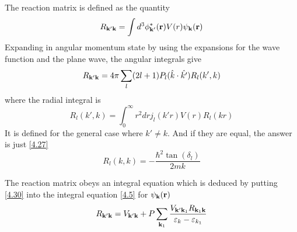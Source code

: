 The reaction matrix is defined as the quantity
\begin{equation}
    R_{\mathbf{k}' \mathbf{k}} = \int d^3 \phi^*_{\mathbf{k}'}(\mathbf{r}) V(r) \psi_{\mathbf{k}}(\mathbf{r})  \label{4.30}
\end{equation}
Expanding in angular momentum state by using the expansions for the wave function and the plane wave, the angular integrals give
\begin{equation}
    R_{\mathbf{k}'\mathbf{k}} = 4\pi \sum_l(2l+1) P_l(\hat{k}\cdot \hat{k'} ) R_l(k',k)   \label{4.31}
\end{equation}
where the radial integral is
\begin{equation}
    R_l(k',k) = \int_0^\infty r^2 dr j_l(k'r) V(r) R_l(kr)  \label{4.32}
\end{equation}
It is defined for the general case where $k' \neq k$.
And if they are equal, the answer is just \eqref{4.27}
\begin{equation}
    R_l(k,k) = -\frac{\hbar^2 \tan(\delta_l)}{2mk}  \label{4.33}
\end{equation}

The reaction matrix obeys an integral equation which is deduced by putting \eqref{4.30} into the integral equation \eqref{4.5} for $\psi_{\mathbf{k}}(\mathbf{r})$
\begin{equation}
    R_{\mathbf{k}'\mathbf{k}} = V_{\mathbf{k}'\mathbf{k}} + P \sum_{\mathbf{k}_1} \frac{V_{\mathbf{k}'\mathbf{k}_1} R_{\mathbf{k}_1 \mathbf{k}}}{\varepsilon_k -\varepsilon_{k_1}} \label{4.34}
\end{equation}
